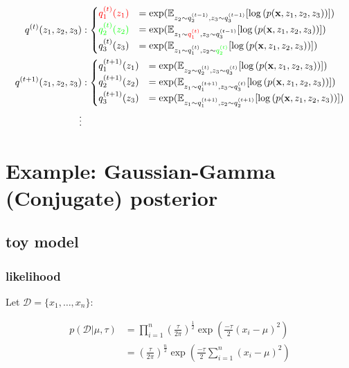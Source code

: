 \documentclass{article}
\begin{document}
\begin{equation}\begin{split}
q^{(t)}(z_1,z_2,z_3)&: \begin{cases}
{\color{red}q_1^{(t)}(z_1)} &= \exp(\mathbb{E}_{z_2 \sim q_2^{(t-1)}, z_3 \sim q_3^{(t-1)}} [ \log{(p({\mathbf x},z_1,z_2,z_3))} ])\\
{\color{green}q_2^{(t)}(z_2)} &= \exp(\mathbb{E}_{z_1 \sim {\color{red}q_1^{(t)}}, z_3 \sim q_3^{(t-1)}} [ \log{(p({\mathbf x},z_1,z_2,z_3))} ])\\ 
q_3^{(t)}(z_3) &= \exp(\mathbb{E}_{z_1 \sim q_1^{(t)}, z_2 \sim {\color{green}q_2^{(t)}}} [ \log{(p({\mathbf x},z_1,z_2,z_3))} ])\\ 
\end{cases}\\
q^{(t+1)}(z_1,z_2,z_3)&: \begin{cases}
q_1^{(t+1)}(z_1) &= \exp(\mathbb{E}_{z_2 \sim q_2^{(t)}, z_3 \sim q_3^{(t)}} [ \log{(p({\mathbf x},z_1,z_2,z_3))} ])\\
q_2^{(t+1)}(z_2) &= \exp(\mathbb{E}_{z_1 \sim q_1^{(t+1)}, z_3 \sim q_3^{(t)}} [ \log{(p({\mathbf x},z_1,z_2,z_3))} ])\\ 
q_3^{(t+1)}(z_3) &= \exp(\mathbb{E}_{z_1 \sim q_1^{(t+1)}, z_2 \sim q_2^{(t+1)}} [ \log{(p({\mathbf x},z_1,z_2,z_3))} ])\\ 
\end{cases}\\
\vdots
\end{split}\end{equation}



\newpage




\section{Example: Gaussian-Gamma (Conjugate) posterior}

\subsection{toy model}

\subsubsection{likelihood}

Let $\mathcal{D} = \{x_1, \dots, x_n \}$:

\begin{equation}\begin{split}
p ( \mathcal{D}| \mu, \tau ) &= \prod_{i=1}^n \left( \frac{\tau}{2 \pi}  \right)^{\frac{1}{2}}   \exp \left( \frac{-\tau}{2} (x_i - \mu)^2 \right) \\
 &=  \left( \frac{\tau}{2 \pi} \right)^{\frac{n}{2}}   \exp \left( \frac{-\tau}{2} \sum_{i=1}^n (x_i - \mu)^2 \right) \\
\end{split}\end{equation}
\end{document}
